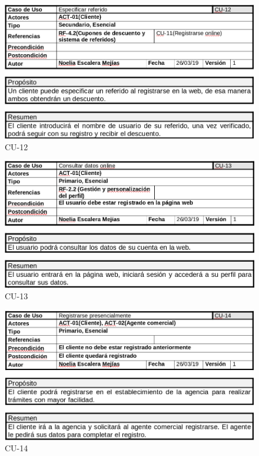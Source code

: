 \documentclass{article}
\begin{document}
	\begin{figure}[H]
		\centering
		\includegraphics[totalheight=8cm]{cu-12}
		\caption{CU-12}
		\label{fig:cu-12}
	\end{figure}

	\begin{figure}[H]
		\centering
		\includegraphics[totalheight=8cm]{cu-13}
		\caption{CU-13}
		\label{fig:cu-13}
	\end{figure}

	\begin{figure}[H]
		\centering
		\includegraphics[totalheight=8cm]{cu-14}
		\caption{CU-14}
		\label{fig:cu-14}
	\end{figure}
\end{document}
